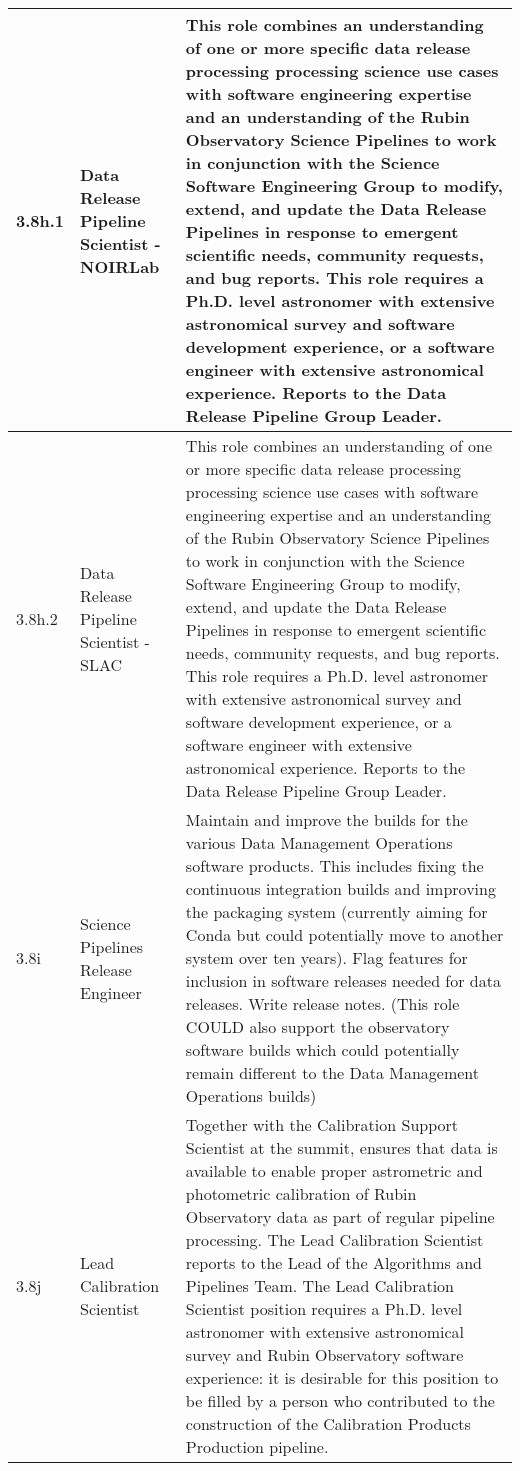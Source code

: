 \begin{longtable} {|p{}|p{}|p{}|}
{3.8h.1}&{Data Release Pipeline Scientist - NOIRLab}&{This role combines an understanding of one or more specific data release processing processing science use cases with software engineering expertise and an understanding of the Rubin Observatory Science Pipelines to work in conjunction with the Science Software Engineering Group to modify, extend, and update the Data Release Pipelines in response to emergent scientific needs, community requests, and bug reports. This role requires a Ph.D. level astronomer with extensive astronomical survey and software development experience, or a software engineer with extensive astronomical experience. Reports to the Data Release Pipeline Group Leader.} \\ \hline
{3.8h.2}&{Data Release Pipeline Scientist - SLAC}&{This role combines an understanding of one or more specific data release processing processing science use cases with software engineering expertise and an understanding of the Rubin Observatory Science Pipelines to work in conjunction with the Science Software Engineering Group to modify, extend, and update the Data Release Pipelines in response to emergent scientific needs, community requests, and bug reports. This role requires a Ph.D. level astronomer with extensive astronomical survey and software development experience, or a software engineer with extensive astronomical experience. Reports to the Data Release Pipeline Group Leader.} \\ \hline
{3.8i}&{Science Pipelines Release Engineer}&{Maintain and improve the builds for the various Data Management Operations software products. This includes fixing the continuous integration builds and improving the packaging system (currently aiming for Conda but could potentially move to another system over ten years). Flag features for inclusion in software releases needed for data releases. Write release notes. (This role COULD also support the observatory software builds which could potentially remain different to the Data Management Operations builds)} \\ \hline
{3.8j}&{Lead Calibration Scientist}&{Together with the Calibration Support Scientist at the summit, ensures that data is available to enable proper astrometric and photometric calibration of Rubin Observatory data as part of regular pipeline processing. The Lead Calibration Scientist reports to the Lead of the Algorithms and Pipelines Team. The Lead Calibration Scientist position requires a Ph.D. level astronomer with extensive astronomical survey and Rubin Observatory software experience: it is desirable for this position to be filled by a person who contributed to the construction of the Calibration Products Production pipeline.} \\ \hline

\end{longtable}
